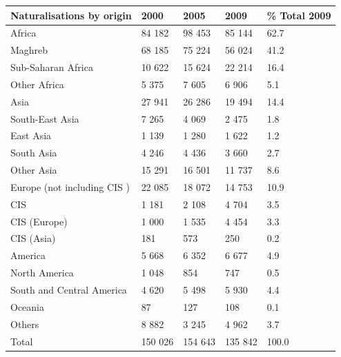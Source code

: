 \documentclass{article}
\begin{document}
\begin{tabular}{lllll}
\toprule
Naturalisations by origin & 2000 & 2005 & 2009 & \% Total 2009 \\
\midrule
Africa & 84 182 & 98 453 & 85 144 & 62.7 \\
Maghreb & 68 185 & 75 224 & 56 024 & 41.2 \\
Sub-Saharan Africa & 10 622 & 15 624 & 22 214 & 16.4 \\
Other Africa & 5 375 & 7 605 & 6 906 & 5.1 \\
Asia & 27 941 & 26 286 & 19 494 & 14.4 \\
South-East Asia & 7 265 & 4 069 & 2 475 & 1.8 \\
East Asia & 1 139 & 1 280 & 1 622 & 1.2 \\
South Asia & 4 246 & 4 436 & 3 660 & 2.7 \\
Other Asia & 15 291 & 16 501 & 11 737 & 8.6 \\
Europe (not including CIS ) & 22 085 & 18 072 & 14 753 & 10.9 \\
CIS & 1 181 & 2 108 & 4 704 & 3.5 \\
CIS (Europe) & 1 000 & 1 535 & 4 454 & 3.3 \\
CIS (Asia) & 181 & 573 & 250 & 0.2 \\
America & 5 668 & 6 352 & 6 677 & 4.9 \\
North America & 1 048 & 854 & 747 & 0.5 \\
South and Central America & 4 620 & 5 498 & 5 930 & 4.4 \\
Oceania & 87 & 127 & 108 & 0.1 \\
Others & 8 882 & 3 245 & 4 962 & 3.7 \\
Total & 150 026 & 154 643 & 135 842 & 100.0 \\
\bottomrule
\end{tabular}
\end{document}
